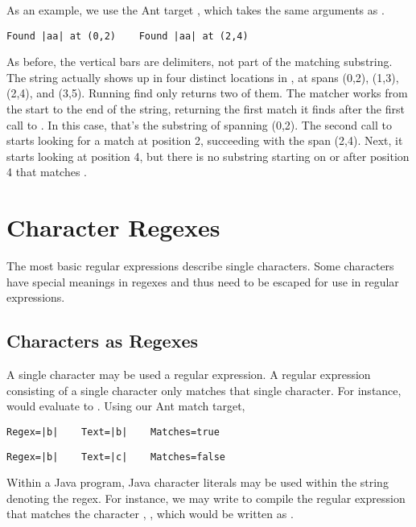 As an example, we use the Ant target , which takes
the same arguments as .
%
%
\begin{verbatim}
Found |aa| at (0,2)    Found |aa| at (2,4)
\end{verbatim}
%
As before, the vertical bars are delimiters, not part of the matching
substring.  The string  actually shows up in four
distinct locations in , at spans (0,2), (1,3),
(2,4), and (3,5).  Running find only returns two of them.  The matcher
works from the start to the end of the string, returning the first
match it finds after the first call to .  In this case,
that's the substring of  spanning (0,2).  The
second call to  starts looking for a match at position 2,
succeeding with the span (2,4).  Next, it starts looking at position
4, but there is no substring starting on or after position 4 that
matches .


\section{Character Regexes}

The most basic regular expressions describe single characters.  Some
characters have special meanings in regexes and thus need to be
escaped for use in regular expressions.

\subsection{Characters as Regexes}

A single character may be used a regular expression.  A regular
expression consisting of a single character only matches that single
character.  For instance,
 would evaluate to
.  Using our Ant match target, 
%
\begin{verbatim}
Regex=|b|    Text=|b|    Matches=true
\end{verbatim}
%
\begin{verbatim}
Regex=|b|    Text=|c|    Matches=false
\end{verbatim}
%
Within a Java program, Java character literals may be used within the
string denoting the regex.  For instance, we may write
 to compile the regular expression
that matches the character , , which would be written as .

